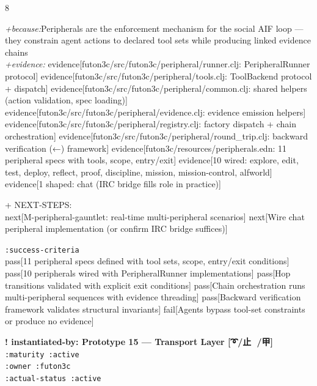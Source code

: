 \documentclass[landscape]{article}
\newcommand{\flexitag}[1]{\textcolor[gray]{0.35}{\textit{#1}}}
\newenvironment{devmapactive}{%
  \def\FrameCommand{\colorbox{devmapactivebg}}%
  \setlength{\fboxsep}{2pt}%
  \MakeFramed{\advance\hsize-\width \FrameRestore}%
}{\endMakeFramed}
\begin{document}
\begin{paracol}{8}
\begin{devmapactive}
  \flexitag{+because:}Peripherals are the enforcement mechanism for the social AIF loop — they constrain agent actions to declared tool sets while producing linked evidence chains\\
  \flexitag{+evidence:} evidence[futon3c/src/futon3c/peripheral/runner.clj: PeripheralRunner protocol] evidence[futon3c/src/futon3c/peripheral/tools.clj: ToolBackend protocol + dispatch] evidence[futon3c/src/futon3c/peripheral/common.clj: shared helpers (action validation, spec loading)] evidence[futon3c/src/futon3c/peripheral/evidence.clj: evidence emission helpers] evidence[futon3c/src/futon3c/peripheral/registry.clj: factory dispatch + chain orchestration] evidence[futon3c/src/futon3c/peripheral/round\_trip.clj: backward verification (←) framework] evidence[futon3c/resources/peripherals.edn: 11 peripheral specs with tools, scope, entry/exit] evidence[10 wired: explore, edit, test, deploy, reflect, proof, discipline, mission, mission-control, alfworld] evidence[1 shaped: chat (IRC bridge fills role in practice)]\\
\par
  + NEXT-STEPS:\\
    next[M-peripheral-gauntlet: real-time multi-peripheral scenarios] next[Wire chat peripheral implementation (or confirm IRC bridge suffices)]\\
\par
  \texttt{:\allowbreak{}success-\allowbreak{}criteria}\\
    pass[11 peripheral specs defined with tool sets, scope, entry/exit conditions] pass[10 peripherals wired with PeripheralRunner implementations] pass[Hop transitions validated with explicit exit conditions] pass[Chain orchestration runs multi-peripheral sequences with evidence threading] pass[Backward verification framework validates structural invariants] fail[Agents bypass tool-set constraints or produce no evidence]\\
\par
\par
\end{devmapactive}
\begin{devmapactive}
\textbf{! instantiated-by: Prototype 15 — Transport Layer [➰/止 🌂/甲]}\\
  \texttt{:\allowbreak{}maturity :\allowbreak{}active}\\
  \texttt{:\allowbreak{}owner :\allowbreak{}futon3c}\\
  \texttt{:\allowbreak{}actual-\allowbreak{}status :\allowbreak{}active}\\

\end{devmapactive}
\end{paracol}
\end{document}
